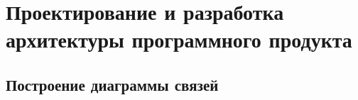 \section{Проектирование и разработка архитектуры программного продукта}

\subsection{Построение диаграммы связей}